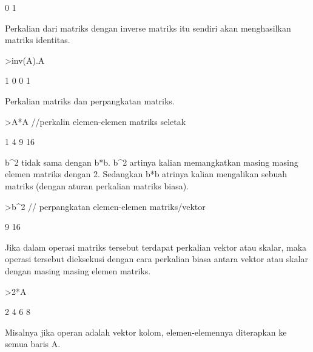 \documentclass{article}
\begin{document}
\begin{eulernotebook}
\begin{euleroutput}
              0             1 
\end{euleroutput}
\begin{eulercomment}
Perkalian dari matriks dengan inverse matriks itu sendiri akan
menghasilkan matriks identitas.
\end{eulercomment}
\begin{eulerprompt}
>inv(A).A
\end{eulerprompt}
\begin{euleroutput}
              1             0 
              0             1 
\end{euleroutput}
\begin{eulercomment}
Perkalian matriks dan perpangkatan matriks.
\end{eulercomment}
\begin{eulerprompt}
>A*A //perkalin elemen-elemen matriks seletak
\end{eulerprompt}
\begin{euleroutput}
              1             4 
              9            16 
\end{euleroutput}
\begin{eulercomment}
b\textasciicircum{}2 tidak sama dengan b*b. b\textasciicircum{}2 artinya kalian memangkatkan masing
masing elemen matriks dengan 2. Sedangkan b*b atrinya kalian
mengalikan sebuah matriks (dengan aturan perkalian matriks biasa).
\end{eulercomment}
\begin{eulerprompt}
>b^2 // perpangkatan elemen-elemen matriks/vektor
\end{eulerprompt}
\begin{euleroutput}
              9 
             16 
\end{euleroutput}
\begin{eulercomment}
Jika dalam operasi matriks tersebut terdapat perkalian vektor atau
skalar, maka operasi tersebut dieksekusi dengan cara perkalian biasa
antara vektor atau skalar dengan masing masing elemen matriks.
\end{eulercomment}
\begin{eulerprompt}
>2*A
\end{eulerprompt}
\begin{euleroutput}
              2             4 
              6             8 
\end{euleroutput}
\begin{eulercomment}
Misalnya jika operan adalah vektor kolom, elemen-elemennya diterapkan
ke semua baris A.
\end{eulercomment}

\end{eulernotebook}
\end{document}
